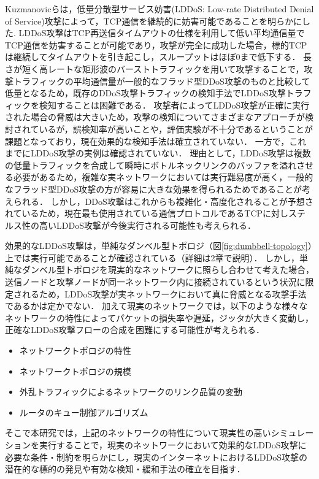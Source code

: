 \documentclass[Japanese]{dicomopapers}
\begin{document}
Kuzmanovicらは，低量分散型サービス妨害(LDDoS: Low-rate Distributed Denial of Service)攻撃によって，TCP通信を継続的に妨害可能であることを明らかにした\cite{ldos}.
LDDoS攻撃はTCP再送信タイムアウトの仕様を利用して低い平均通信量でTCP通信を妨害することが可能であり，攻撃が完全に成功した場合，標的TCPは継続してタイムアウトを引き起こし，スループットはほぼ0まで低下する．
長さが短く高レートな矩形波のバーストトラフィックを用いて攻撃することで，攻撃トラフィックの平均通信量が一般的なフラッド型DDoS攻撃のものと比較して低量となるため，既存のDDoS攻撃トラフィックの検知手法でLDDoS攻撃トラフィックを検知することは困難である．
攻撃者によってLDDoS攻撃が正確に実行された場合の脅威は大きいため，攻撃の検知についてさまざまなアプローチ\cite{cpr1}\cite{cpr2}\cite{entropy1}が検討されているが，誤検知率が高いことや，評価実験が不十分であるということが課題となっており，現在効果的な検知手法は確立されていない．
一方で，これまでにLDDoS攻撃の実例は確認されていない．
理由として，LDDoS攻撃は複数の低量トラフィックを合成して瞬時にボトルネックリンクのバッファを溢れさせる必要があるため，複雑な実ネットワークにおいては実行難易度が高く，一般的なフラッド型DDoS攻撃の方が容易に大きな効果を得られるためであることが考えられる．
しかし，DDoS攻撃はこれからも複雑化・高度化されることが予想されているため\cite{cdn}，現在最も使用されている通信プロトコルであるTCPに対しステルス性の高いLDDoS攻撃が今後実行される可能性も考えられる．

効果的なLDDoS攻撃は，単純なダンベル型トポロジ（図\ref{fig:dumbbell-topology}）上では実行可能であることが確認されている（詳細は2章で説明）．
しかし，単純なダンベル型トポロジを現実的なネットワークに照らし合わせて考えた場合，送信ノードと攻撃ノードが同一ネットワーク内に接続されているという状況に限定されるため，LDDoS攻撃が実ネットワークにおいて真に脅威となる攻撃手法であるかは定かでない．
加えて現実のネットワークでは，以下のような様々なネットワークの特性によってパケットの損失率や遅延，ジッタが大きく変動し，正確なLDDoS攻撃フローの合成を困難にする可能性が考えられる．

\begin{itemize}
    \item ネットワークトポロジの特性
    \item ネットワークトポロジの規模
    \item 外乱トラフィックによるネットワークのリンク品質の変動
    \item ルータのキュー制御アルゴリズム
\end{itemize}

そこで本研究では，上記のネットワークの特性について現実性の高いシミュレーションを実行することで，現実のネットワークにおいて効果的なLDDoS攻撃に必要な条件・制約を明らかにし，現実のインターネットにおけるLDDoS攻撃の潜在的な標的の発見や有効な検知・緩和手法の確立を目指す．
\end{document}
